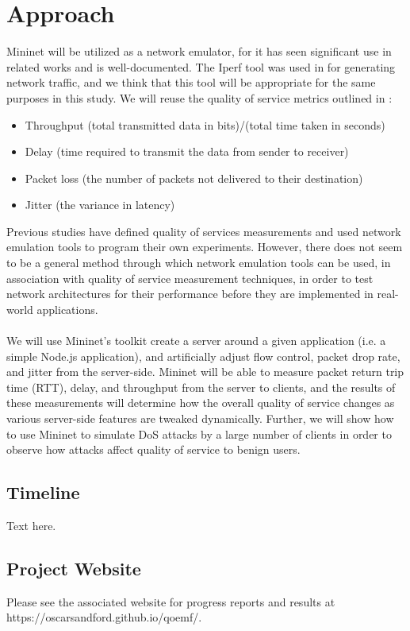 \documentclass{article}
\begin{document}
\section{Approach}
Mininet will be utilized as a network emulator, for it has seen significant use in related works \cite{mininet_emulation_2014,qos_analysis_2022,chauhan_atulkar_2020} and 
is well-documented. The Iperf tool was used in \cite{chauhan_atulkar_2020} for generating network traffic, and we think that this tool will be appropriate for the same 
purposes in this study. We will reuse the quality of service metrics outlined in \cite{qos_analysis_2022}: 
\begin{itemize}
    \item Throughput (total transmitted data in bits)/(total time taken in seconds)
    \item Delay (time required to transmit the data from sender to receiver)
    \item Packet loss (the number of packets not delivered to their destination)
    \item Jitter (the variance in latency)
\end{itemize} 
Previous studies have defined quality of services measurements and used network emulation tools to program their own experiments. However, there does not seem to be a 
general method through which network emulation tools can be used, in association with quality of service measurement techniques, in order to test network architectures 
for their performance before they are implemented in real-world applications. \\\\
We will use Mininet's toolkit create a server around a given application (i.e. a simple Node.js application), and artificially adjust flow control, packet drop rate, 
and jitter from the server-side. Mininet will be able to measure packet return trip time (RTT), delay, and throughput from the server to clients, and the results of 
these measurements will determine how the overall quality of service changes as various server-side features are tweaked dynamically. Further, we will show how to use 
Mininet to simulate DoS attacks by a large number of clients in order to observe how attacks affect quality of service to benign users. 

\subsection{Timeline}
Text here.

\subsection{Project Website}
Please see the associated website for progress reports and results at https://oscarsandford.github.io/qoemf/.



\end{document}

